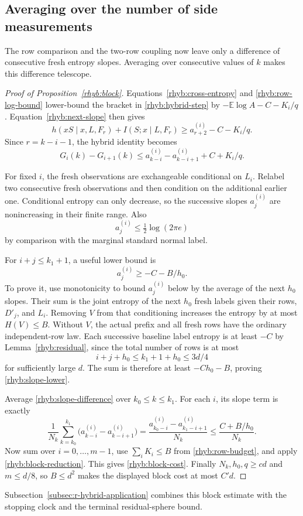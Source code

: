 \subsection{Averaging over the number of side measurements}

The row comparison and the two-row coupling now leave only a difference
of consecutive fresh entropy slopes.  Averaging over consecutive values
of \(k\) makes this difference telescope.

\begin{proof}[Proof of Proposition~\ref{rhyb:block}]
Equations~\eqref{rhyb:cross-entropy} and \eqref{rhyb:row-log-bound}
lower-bound the bracket in \eqref{rhyb:hybrid-step} by
\(-\mathbb E\log A-C-K_i/q\).  Equation~\eqref{rhyb:next-slope} then
gives
\[
 h(xS\mid x,L,F_r)+I(S;x\mid L,F_r)
 \ge a_{r+2}^{(i)}-C-K_i/q.
\]
Since \(r=k-i-1\), the hybrid identity becomes
\begin{equation}\label{rhyb:slope-difference}
 G_i(k)-G_{i+1}(k)
 \le a_{k-i}^{(i)}-a_{k-i+1}^{(i)}+C+K_i/q.
\end{equation}

For fixed \(i\), the fresh observations are exchangeable conditional on
\(L_i\).  Relabel two consecutive fresh observations and then condition
on the additional earlier one.  Conditional entropy can only decrease,
so the successive slopes \(a_j^{(i)}\) are nonincreasing in their
finite range.  Also
\[
 a_j^{(i)}\le\tfrac12\log(2\pi e)
\]
by comparison with the marginal standard normal label.

For \(i+j\le k_1+1\), a useful lower bound is
\begin{equation}\label{rhyb:slope-lower}
 a_j^{(i)}\ge-C-B/h_0.
\end{equation}
To prove it, use monotonicity to bound \(a_j^{(i)}\) below by the
average of the next \(h_0\) slopes.  Their sum is the joint entropy of
the next \(h_0\) fresh labels given their rows, \(D'_j\), and \(L_i\).
Removing \(V\) from that conditioning increases the entropy by at most
\(H(V)\le B\).  Without \(V\), the actual prefix and all fresh rows have
the ordinary independent-row law.  Each successive baseline label
entropy is at least \(-C\) by Lemma~\ref{rhyb:residual}, since the total
number of rows is at most
\[
 i+j+h_0\le k_1+1+h_0\le3d/4
\]
for sufficiently large \(d\).  The sum is therefore at least
\(-Ch_0-B\), proving \eqref{rhyb:slope-lower}.

Average \eqref{rhyb:slope-difference} over \(k_0\le k\le k_1\).
For each \(i\), its slope term is exactly
\[
 \frac1{N_k}\sum_{k=k_0}^{k_1}
 \bigl(a_{k-i}^{(i)}-a_{k-i+1}^{(i)}\bigr)
 =\frac{a_{k_0-i}^{(i)}-a_{k_1-i+1}^{(i)}}{N_k}
 \le\frac{C+B/h_0}{N_k}.
\]
Now sum over \(i=0,\ldots,m-1\), use
\(\sum_iK_i\le B\) from \eqref{rhyb:row-budget}, and apply
\eqref{rhyb:block-reduction}.  This gives \eqref{rhyb:block-cost}.
Finally \(N_k,h_0,q\ge cd\) and \(m\le d/8\), so \(B\le d^2\) makes
the displayed block cost at most \(C'd\).
\end{proof}


Subsection~\ref{subsec:r-hybrid-application} combines this block estimate with the stopping clock and the terminal residual-sphere bound.
